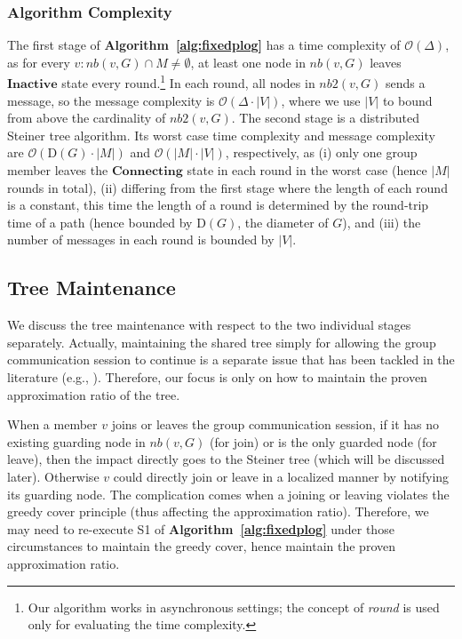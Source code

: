 \documentclass[10pt, conference, compsocconf]{IEEEtran}
\begin{document}
    \subsubsection{Algorithm Complexity} The first stage of \textbf{Algorithm~\ref{alg:fixedplog}} has a time complexity of $\mathcal{O}(\Delta)$, as for every $v: \mathit{nb}(v,G) \cap M \neq \emptyset$, at least one node in $\mathit{nb}(v,G)$ leaves $\mathbf{Inactive}$ state every round.\footnote{Our algorithm works in asynchronous settings; the concept of \textit{round} is used only for evaluating the time complexity.} In each round, all nodes in $\mathit{nb2}(v, G)$ sends a message, so the message complexity is $\mathcal{O}(\Delta \cdot |V|)$, where we use $|V|$ to bound from above the cardinality of $\mathit{nb2}(v, G)$. The second stage is a distributed Steiner tree algorithm. Its worst case time complexity and message complexity are $\mathcal{O}(\mathrm{D}(G) \cdot |M|)$ and $\mathcal{O}(|M| \cdot |V|)$, respectively, as (i) only one group member leaves the $\mathbf{Connecting}$ state in each round in the worst case (hence $|M|$ rounds in total), (ii) differing from the first stage where the length of each round is a constant, this time the length of a round is determined by the round-trip time of a path (hence bounded by $\mathrm{D}(G)$, the diameter of $G$), and (iii) the number of messages in each round is bounded by $|V|$.

  \subsection{Tree Maintenance}
We discuss the tree maintenance with respect to the two individual stages separately. Actually, maintaining the shared tree simply for allowing the group communication session to continue is a separate issue that has been tackled in the literature (e.g., \cite{Chiang1998,Ji1998,Jia98}). Therefore, our focus is only on how to maintain the proven approximation ratio of the tree.

    When a member $v$ joins or leaves the group communication session, if it has no existing guarding node in $\mathit{nb}(v,G)$ (for join) or is the only guarded node (for leave), then the impact directly goes to the Steiner tree (which will be discussed later). Otherwise $v$ could directly join or leave in a localized manner by notifying its guarding node. The complication comes when a joining or leaving violates the greedy cover principle (thus affecting the approximation ratio). Therefore, we may need to re-execute S1 of \textbf{Algorithm~\ref{alg:fixedplog}} under those circumstances to maintain the greedy cover, hence maintain the proven approximation ratio.
\end{document}
